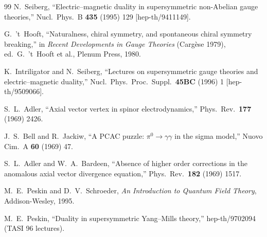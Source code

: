 \documentclass[11pt,a4paper]{article}
\begin{document}
\begin{thebibliography}{99}
  N.~Seiberg, ``Electric--magnetic duality in supersymmetric non-Abelian
  gauge theories,'' Nucl.\ Phys.\ B \textbf{435} (1995) 129
  [hep-th/9411149].

  G.~'t~Hooft, ``Naturalness, chiral symmetry, and spontaneous chiral
  symmetry breaking,'' in \textit{Recent Developments in Gauge Theories}
  (Carg\`ese 1979), ed.\ G.~'t~Hooft et al., Plenum Press, 1980.

  K.~Intriligator and N.~Seiberg, ``Lectures on supersymmetric gauge
  theories and electric--magnetic duality,'' Nucl.\ Phys.\ Proc.\ Suppl.\
  \textbf{45BC} (1996) 1 [hep-th/9509066].

  S.~L.~Adler, ``Axial vector vertex in spinor electrodynamics,''
  Phys.\ Rev.\ \textbf{177} (1969) 2426.

  J.~S.~Bell and R.~Jackiw, ``A PCAC puzzle: $\pi^0 \to \gamma\gamma$
  in the sigma model,'' Nuovo Cim.\ A \textbf{60} (1969) 47.

  S.~L.~Adler and W.~A.~Bardeen, ``Absence of higher order corrections
  in the anomalous axial vector divergence equation,'' Phys.\ Rev.\
  \textbf{182} (1969) 1517.

  M.~E.~Peskin and D.~V.~Schroeder, \textit{An Introduction to Quantum
  Field Theory}, Addison-Wesley, 1995.

  M.~E.~Peskin, ``Duality in supersymmetric Yang--Mills theory,''
  hep-th/9702094 (TASI 96 lectures).
\end{thebibliography}
\end{document}

